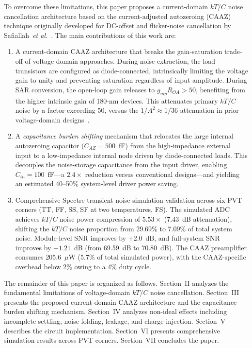 \documentclass[journal]{IEEEtran}
\begin{document}
To overcome these limitations, this paper proposes a current-domain $kT/C$ noise cancellation architecture based on the current-adjusted autozeroing (CAAZ) technique originally developed for DC-offset and flicker-noise cancellation by Safiallah~\textit{et al.}~\cite{safiallah2023_Currentadjusting}. The main contributions of this work are:

\begin{enumerate}
    \item A current-domain CAAZ architecture that breaks the gain-saturation trade-off of voltage-domain approaches. During noise extraction, the load transistors are configured as diode-connected, intrinsically limiting the voltage gain to unity and preventing saturation regardless of input amplitude. During SAR conversion, the open-loop gain releases to $g_{mp}R_{OA}>50$, benefiting from the higher intrinsic gain of 180-nm devices. This attenuates primary $kT/C$ noise by a factor exceeding 50, versus the $1/A^2\approx 1/36$ attenuation in prior voltage-domain designs~\cite{liu202013bit}.

    \item A \textit{capacitance burden shifting} mechanism that relocates the large internal autozeroing capacitor ($C_{AZ}=500$~fF) from the high-impedance external input to a low-impedance internal node driven by diode-connected loads. This decouples the noise-storage capacitance from the input driver, enabling $C_{in}=100$~fF---a $2.4\times$ reduction versus conventional designs---and yielding an estimated 40--50\% system-level driver power saving.

    \item Comprehensive Spectre transient-noise simulation validation across six PVT corners (TT, FF, SS, SF at two temperatures, FS). The simulated ADC achieves $kT/C$ noise power compression of $5.53\times$ (7.43~dB attenuation), shifting the $kT/C$ noise proportion from 29.69\% to 7.09\% of total system noise. Module-level SNR improves by $+2.0$~dB, and full-system SNR improves by $+1.21$~dB (from 69.59~dB to 70.80~dB). The CAAZ preamplifier consumes 205.6~$\mu$W (5.7\% of total simulated power), with the CAAZ-specific overhead below 2\% owing to a 4\% duty cycle.
\end{enumerate}

The remainder of this paper is organized as follows. Section~II analyzes the fundamental limitations of voltage-domain $kT/C$ noise cancellation. Section~III presents the proposed current-domain CAAZ architecture and the capacitance burden shifting mechanism. Section~IV analyzes non-ideal effects including incomplete settling, noise folding, leakage, and charge injection. Section~V describes the circuit implementation. Section~VI presents comprehensive simulation results across PVT corners. Section~VII concludes the paper.
\end{document}
